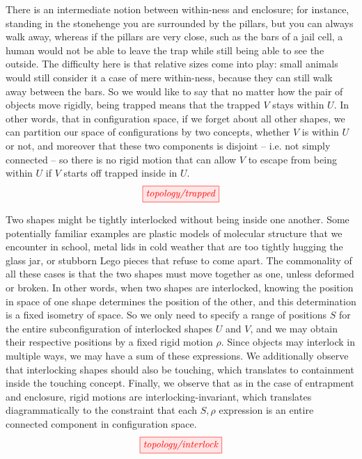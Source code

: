 \begin{myboxB}
\begin{defn}\label{defn:trapped}
There is an intermediate notion between within-ness and enclosure; for instance, standing in the stonehenge you are surrounded by the pillars, but you can always walk away, whereas if the pillars are very close, such as the bars of a jail cell, a human would not be able to leave the trap while still being able to see the outside. The difficulty here is that relative sizes come into play: small animals would still consider it a case of mere within-ness, because they can still walk away between the bars. So we would like to say that no matter how the pair of objects move rigidly, being trapped means that the trapped $V$ stays within $U$. In other words, that in configuration space, if we forget about all other shapes, we can partition our space of configurations by two concepts, whether $V$ is within $U$ or not, and moreover that these two components is disjoint -- i.e. not simply connected -- so there is no rigid motion that can allow $V$ to escape from being within $U$ if $V$ starts off trapped inside in $U$.
\[\tikzfig{topology/trapped}\]
\end{defn}
\end{myboxB}

\begin{myboxR}
\begin{defn}\label{defn:interlocked}
Two shapes might be tightly interlocked without being inside one another. Some potentially familiar examples are plastic models of molecular structure that we encounter in school, metal lids in cold weather that are too tightly hugging the glass jar, or stubborn Lego pieces that refuse to come apart. The commonality of all these cases is that the two shapes must move together as one, unless deformed or broken. In other words, when two shapes are interlocked, knowing the position in space of one shape determines the position of the other, and this determination is a fixed isometry of space. So we only need to specify a range of positions $S$ for the entire subconfiguration of interlocked shapes $U$ and $V$, and we may obtain their respective positions by a fixed rigid motion $\rho$. Since objects may interlock in multiple ways, we may have a sum of these expressions. We additionally observe that interlocking shapes should also be touching, which translates to containment inside the touching concept. Finally, we observe that as in the case of entrapment and enclosure, rigid motions are interlocking-invariant, which translates diagrammatically to the constraint that each $S,\rho$ expression is an entire connected component in configuration space.
\[\tikzfig{topology/interlock}\]
\end{defn}
\end{myboxR}

